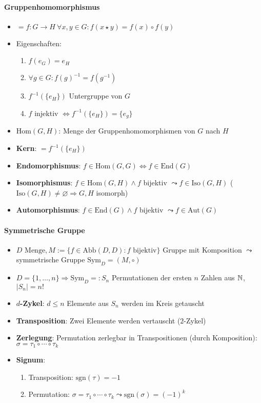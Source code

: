 \paragraph{Gruppenhomomorphismus}
\begin{itemize}
  \item $=f:G \rightarrow H \ \forall x,y \in G: f(x \star y) = f(x) \circ f(y)$
  \item Eigenschaften:
  \begin{enumerate}
    \item $f(e_G) = e_H$
    \item $\forall g \in G: f(g)^{-1} = f(g^{-1})$
    \item $f^{-1}(\{ e_H \} )$ Untergruppe von $G$
    \item $f$ injektiv $\Leftrightarrow f^{-1}(\{ e_H \} ) = \{ e_g \}$
  \end{enumerate}
  \item \textbf{$\text{Hom}(G,H)$}: Menge der Gruppenhomomorphismen von $G$ nach $H$
  \item \textbf{Kern}: $=f^{-1}(\{ e_H \})$
  \item \textbf{Endomorphismus}: $f \in \text{Hom}(G,G) \Leftrightarrow f \in \text{End}(G)$
  \item \textbf{Isomorphismus}: $f \in \text{Hom}(G,H) \wedge f$ bijektiv $\leadsto f \in \text{Iso}(G,H)$ ($\text{Iso}(G,H) \neq \varnothing \Rightarrow G,H$ isomorph)
  \item \textbf{Automorphismus}: $f \in \text{End}(G) \wedge f$ bijektiv $\leadsto f \in \text{Aut}(G)$
\end{itemize}

\paragraph{Symmetrische Gruppe}
\begin{itemize}
  \item $D \text{ Menge}, M := \{ f \in \text{Abb}(D,D): f \text{ bijektiv} \}$ Gruppe mit Komposition $\leadsto$ symmetrische Gruppe $\text{Sym}_D = (M, \circ)$
  \item $D=\{ 1,\dots ,n \} \Rightarrow \text{Sym}_D =: S_n$ Permutationen der ersten $n$ Zahlen aus $\mathbb{N}$, $|S_n|=n!$
  \item \textbf{$d$-Zykel}: $d \leq n$ Elemente aus $S_n$ werden im Kreis getauscht
  \item \textbf{Transposition}: Zwei Elemente werden vertauscht ($2$-Zykel)
  \item \textbf{Zerlegung}: Permutation zerlegbar in Transpositionen (durch Komposition): $\sigma = \tau_1 \circ \cdots \circ \tau_k$
  \item \textbf{Signum}:
  \begin{enumerate}
    \item Transposition: $\text{sgn}(\tau)=-1$
    \item Permutation: $\sigma = \tau_1 \circ \cdots \circ \tau_k \leadsto \text{sgn}(\sigma)={(-1)}^{k}$
  \end{enumerate}
\end{itemize}